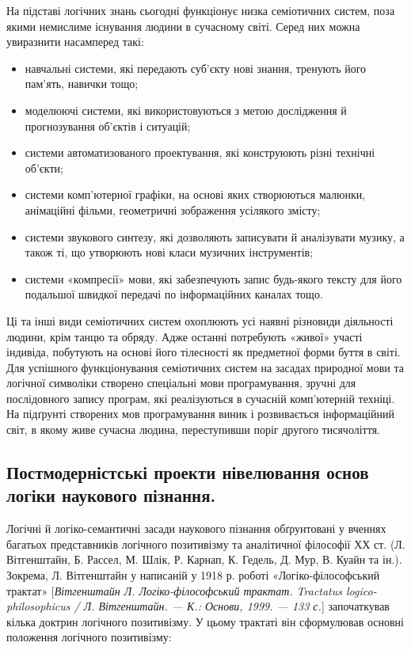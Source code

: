 На підставі логічних знань сьогодні функціонує низка семіотичних систем,
поза якими немислиме існування людини в сучасному світі. Серед них можна
увиразнити насамперед такі:
\begin{itemize}
	\item навчальні системи, які передають суб’єкту нові знання, тренують його
	пам’ять, навички тощо;
	
	\item моделюючі системи, які використовуються з метою дослідження й
	прогнозування об’єк\-тів і ситуацій;

	\item системи автоматизованого проектування, які конструюють різні технічні
	об’єкти;

	\item системи комп’ютерної графіки, на основі яких створюються малюнки,
	анімаційні фільми, геометричні зображення усілякого змісту;

	\item системи звукового синтезу, які дозволяють записувати й аналізувати
	музику, а також ті, що утворюють нові класи музичних інструментів;

	\item системи «компресії» мови, які забезпечують запис будь-якого тексту для
	його подальшої швидкої передачі по інформаційних каналах тощо.
\end{itemize}

Ці та інші види семіотичних систем охоплюють усі наявні різновиди
діяльності людини, крім танцю та обряду. Адже останні потребують «живої»
участі індивіда, побутують на основі його тілесності як предметної форми буття
в світі. Для успішного функціонування семіотичних систем на засадах 
природної мови та логічної символіки створено спеціальні мови
програмування, зручні для послідовного запису програм, які реалізуються в
сучасній комп’ютерній техніці. На підґрунті створених мов програмування
виник і розвивається інформаційний світ, в якому живе сучасна людина,
переступивши поріг другого тисячоліття.

\subsection{Постмодерністські проекти нівелювання основ логіки наукового пізнання.}
Логічні й логіко-семантичні засади наукового пізнання обґрунтовані
у вченнях багатьох представників логічного позитивізму та аналітичної
філософії ХХ ст. (Л. Вітгенштайн, Б. Рассел, М. Шлік, Р. Карнап, К. Гедель, Д.
Мур, В. Куайн та ін.). Зокрема, Л. Вітгенштайн у написаній у 1918 р. роботі
«Логіко-філософський трактат» [\textit{Вітгенштайн Л. Логіко-філософський
трактат. Tractatus logico-philosophicus / Л. Вітгенштайн. --- К.: Основи, 1999. ---
133 с.}] започаткував кілька доктрин логічного позитивізму. У цьому трактаті
він сформулював основні положення логічного позитивізму:

